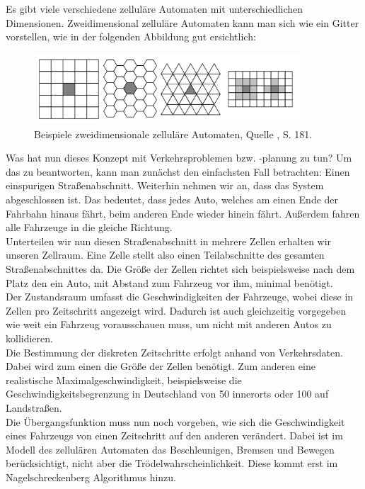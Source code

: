 Es gibt viele verschiedene zelluläre Automaten mit unterschiedlichen Dimensionen. Zweidimensional zelluläre Automaten kann man sich wie ein Gitter vorstellen, wie in der folgenden Abbildung gut ersichtlich:

\begin{figure}[h]
\centering
\includegraphics[width=10cm]{2_ZA_Beispiel.png}
\caption{Beispiele zweidimensionale zelluläre Automaten, Quelle \cite{book:bungartz}, S. 181.}
\end{figure}

Was hat nun dieses Konzept mit Verkehrsproblemen bzw. -planung zu tun? Um das zu beantworten, kann man zunächst den einfachsten Fall betrachten: Einen einspurigen Straßenabschnitt. Weiterhin nehmen wir an, dass das System abgeschlossen ist. Das bedeutet, dass jedes Auto, welches am einen Ende der Fahrbahn hinaus fährt, beim anderen Ende wieder hinein fährt. Außerdem fahren alle Fahrzeuge in die gleiche Richtung. \\

Unterteilen wir nun diesen Straßenabschnitt in mehrere Zellen erhalten wir unseren Zellraum. Eine Zelle stellt also einen Teilabschnitte des gesamten Straßenabschnittes da. Die Größe der Zellen richtet sich beispielsweise nach dem Platz den ein Auto, mit Abstand zum Fahrzeug vor ihm, minimal benötigt. \\

Der Zustandsraum umfasst die Geschwindigkeiten der Fahrzeuge, wobei diese in Zellen pro Zeitschritt angezeigt wird. Dadurch ist auch gleichzeitig vorgegeben wie weit ein Fahrzeug vorausschauen muss, um nicht mit anderen Autos zu kollidieren. \\

Die Bestimmung der diskreten Zeitschritte erfolgt anhand von Verkehrsdaten. Dabei wird zum einen die Größe der Zellen benötigt. Zum anderen eine realistische Maximalgeschwindigkeit, beispielsweise die Geschwindigkeitsbegrenzung in Deutschland von 50 innerorts oder 100 auf Landstraßen.  \\

Die Übergangsfunktion muss nun noch vorgeben, wie sich die Geschwindigkeit eines Fahrzeugs von einen Zeitschritt auf den anderen verändert. Dabei ist im Modell des zellulären Automaten das Beschleunigen, Bremsen und Bewegen berücksichtigt, nicht aber die Trödelwahrscheinlichkeit. Diese kommt erst im Nagelschreckenberg Algorithmus hinzu. \\

